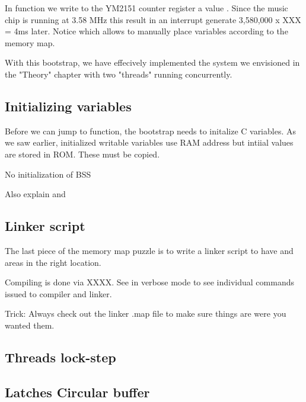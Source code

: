

In function  we write to the YM2151 counter register a value . Since the music chip is running at 3.58 MHz this result in an interrupt generate 3,580,000 x XXX = 4ms later. Notice  which allows to manually place variables according to the memory map.

With this bootstrap, we have effecively implemented the system we envisioned in the "Theory" chapter with two "threads" running concurrently.

\subsection{Initializing variables}
Before we can jump to  function, the bootstrap needs to initalize C variables. As we saw earlier, initialized writable variables use RAM address but intiial values are stored in ROM. These must be copied.




 

No initialization of BSS

Also explain  and 

\subsection{Linker script}

The last piece of the memory map puzzle is to write a linker script to have  and  areas in the right location.



Compiling is done via XXXX. See  in verbose mode to see individual commands issued to  compiler and  linker.

Trick: Always check out the linker .map file to make sure things are were you wanted them.


\subsection{Threads lock-step}

\subsection{Latches Circular buffer}

